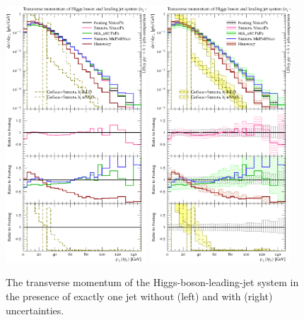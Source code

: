 \begin{figure}[t!]
  \centering
  \includegraphics[width=0.47\textwidth]{figures/hjetscomp_u_Hj_pT_excl.pdf}
  \hfill
  \includegraphics[width=0.47\textwidth]{figures/hjetscomp_Hj_pT_excl.pdf}
  \caption{
    The transverse momentum of the Higgs-boson-leading-jet system in the 
    presence of exactly one jet without (left) and with (right) uncertainties.
    \label{fig:higgscomp:results:1obs:hj_pt_excl}
  }
\end{figure}

